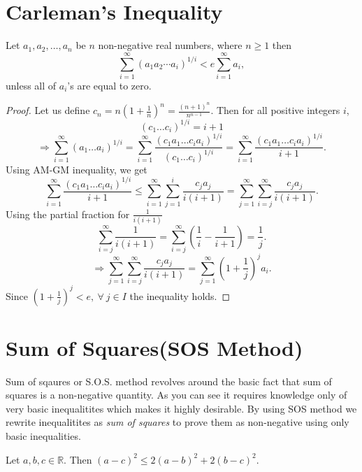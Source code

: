 \section{Carleman's Inequality}
\begin{theorem}
  Let $a_1, a_2, \ldots, a_n$ be $n$ non-negative real numbers, where $n\geq 1$ then
  \begin{equation}
    \sum_{i=1}^{\infty} (a_1 a_2 \dotsm a_i)^{1/i} < e \sum_{i=1}^{\infty} a_i ,
  \end{equation}
  unless all of $a_i$'s are equal to zero.
\end{theorem}

\begin{proof}
  Let us define $c_n = n\left(1 + \frac{1}{n}\right)^n = \frac{(n + 1)^n}{n^{n - 1}}$. Then for all positive integers $i$,
  $$(c_1\ldots c_i)^{1/i} = i + 1$$
  $$\Rightarrow \sum_{i=1}^\infty(a_1\ldots a_i)^{1/i} = \sum_{i=1}^\infty\frac{(c_1a_1\ldots c_ia_i)^{1/i}}{(c_1\ldots
    c_i)^{1/i}} = \sum_{i=1}^\infty\frac{(c_1a_1\ldots c_ia_i)^{1/i}}{i + 1}.$$
  Using AM-GM inequality, we get
  $$\sum_{i=1}^\infty\frac{(c_1a_1\ldots c_ia_i)^{1/i}}{i + 1} \leq \sum_{i=1}^\infty\sum_{j=1}^i\frac{c_ja_j}{i(i + 1)} =
  \sum_{j=1}^\infty\sum_{i=j}^\infty\frac{c_ja_j}{i(i + 1)}.$$
  Using the partial fraction for $\frac{1}{i(i + 1)}$
  $$\sum_{i=j}^\infty\frac{1}{i(i + 1)} = \sum_{i=j}^\infty\left(\frac{1}{i} - \frac{1}{i + 1}\right) = \frac{1}{j}.$$
  $$\Rightarrow \sum_{j=1}^\infty\sum_{i=j}^\infty\frac{c_ja_j}{i(i + 1)} = \sum_{j=1}^\infty\left(1 + \frac{1}{j}\right)^ja_i.$$
  Since $\left(1 + \frac{1}{j}\right)^j< e,~\forall~j\in I$ the inequality holds.
\end{proof}

\section{Sum of Squares(SOS Method)}
Sum of sqaures or S.O.S. method revolves around the basic fact that sum of
squares is a non-negative quantity. As you can see it requires knowledge only of
very basic inequalitites which makes it highly desirable. By using SOS method we
rewrite inequalitites as \textit{sum of squares} to prove them as non-negative
using only basic inequalities.

\begin{proposition}
  \label{pp:sos1}
  Let $a, b, c\in\mathbb{R}$. Then $(a - c)^2\leq 2(a - b)^2 + 2(b - c)^2$.
\end{proposition}

